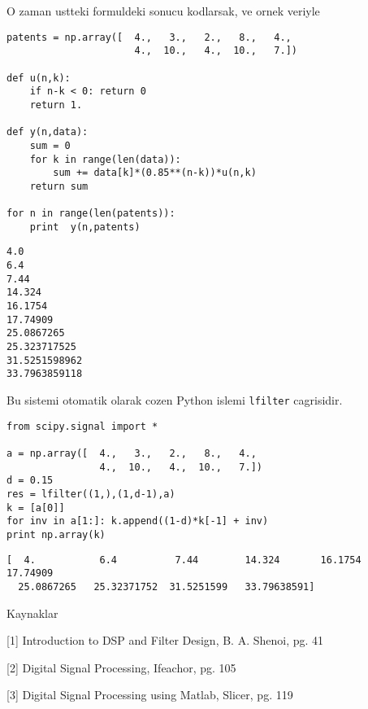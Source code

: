 \documentclass[12pt,fleqn]{article}\usepackage{../common}
\begin{document}
O zaman ustteki formuldeki sonucu kodlarsak, ve ornek veriyle

\begin{verbatim}
patents = np.array([  4.,   3.,   2.,   8.,   4.,  
                      4.,  10.,   4.,  10.,   7.])

def u(n,k):
    if n-k < 0: return 0
    return 1.

def y(n,data):
    sum = 0
    for k in range(len(data)):
        sum += data[k]*(0.85**(n-k))*u(n,k)
    return sum

for n in range(len(patents)):    
    print  y(n,patents)
\end{verbatim}

\begin{verbatim}
4.0
6.4
7.44
14.324
16.1754
17.74909
25.0867265
25.323717525
31.5251598962
33.7963859118
\end{verbatim}

Bu sistemi otomatik olarak cozen Python islemi \verb!lfilter!
cagrisidir.

\begin{verbatim}
from scipy.signal import *

a = np.array([  4.,   3.,   2.,   8.,   4.,  
                4.,  10.,   4.,  10.,   7.])
d = 0.15 
res = lfilter((1,),(1,d-1),a) 
k = [a[0]] 
for inv in a[1:]: k.append((1-d)*k[-1] + inv) 
print np.array(k) 
\end{verbatim}

\begin{verbatim}
[  4.           6.4          7.44        14.324       16.1754      17.74909
  25.0867265   25.32371752  31.5251599   33.79638591]
\end{verbatim}

Kaynaklar

[1] Introduction to DSP and Filter Design, B. A. Shenoi, pg. 41

[2] Digital Signal Processing, Ifeachor, pg. 105

[3] Digital Signal Processing using Matlab, Slicer, pg. 119
\end{document}
